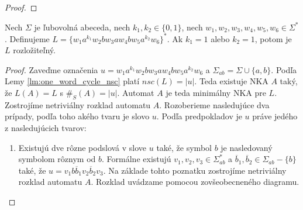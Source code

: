 \begin{proof}
\end{proof}

\begin{proposition}
Nech $ \Sigma $ je ľubovolná abeceda, nech $ k_1,k_2 \in \lbrace 0,1 \rbrace $, nech $ w_1,w_2,w_3,w_4,w_5,w_6 \in \Sigma^* $. Definujeme $ L = \lbrace w_1a^{k_1}w_2bw_3aw_4bw_5a^{k_2}w_6 \rbrace^* $. Ak $ k_1 = 1 $ alebo $ k_2 = 1 $, potom je $ L $ rozložiteľný.
\end{proposition}

\begin{proof}
Zaveďme označenia $ u = w_1a^{k_1}w_2bw_3aw_4bw_5a^{k_2}w_6$ a $ \Sigma_{ab} = \Sigma \cup \lbrace a,b \rbrace $. Podľa Lemy \ref{lm:one_word_cycle_nsc} platí $ nsc(L) = |u| $. Teda existuje NKA $ A $ taký, že $ L(A) = L $ s $ \#_S(A) = |u| $. Automat $ A $ je teda minimálny NKA pre $ L $. Zostrojíme netriviálny rozklad automatu $ A $. Rozoberieme nasledujúce dva prípady, podľa toho akého tvaru je slovo $ u $. Podľa predpokladov je $ u $ práve jedého z nasledujúcich tvarov:

\begin{enumerate}
\item Existujú dve rôzne podslová v slove $ u $ také, že symbol $ b $ je nasledovaný symbolom rôznym od $ b $. Formálne existujú $ v_1,v_2,v_3 \in \Sigma_{ab}^* $ a $ \overline{b}_1,\overline{b}_2 \in \Sigma_{ab} - \lbrace b \rbrace $ také, že $ u = v_1b\overline{b}_1v_2\overline{b}_2v_3 $. Na základe tohto poznatku zostrojíme netriviálny rozklad automatu $ A $. Rozklad uvádzame pomocou zovšeobecneného diagramu.

\begin{figure}[H]
\centering
{}


\end{figure}
\end{enumerate}
\end{proof}
